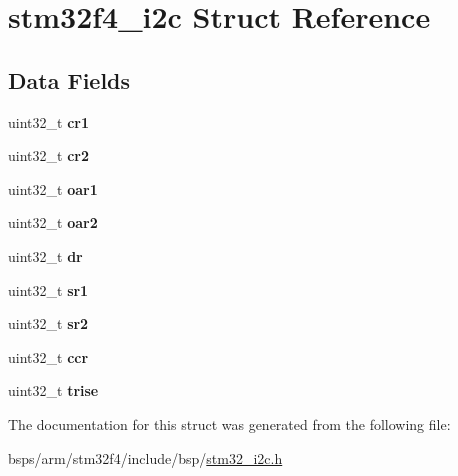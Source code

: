 \hypertarget{structstm32f4__i2c}{}\section{stm32f4\+\_\+i2c Struct Reference}
\label{structstm32f4__i2c}
\subsection*{Data Fields}
\begin{DoxyCompactItemize}
\item 
\mbox{\label{structstm32f4__i2c_a412766684f80de14fd12488ee9137410}} 
uint32\+\_\+t {\bfseries cr1}
\item 
\mbox{\label{structstm32f4__i2c_aaf477e758c1ce5fdbf9ca78893e851f2}} 
uint32\+\_\+t {\bfseries cr2}
\item 
\mbox{\label{structstm32f4__i2c_a9c78ba562e2374d9bb7b83eb67e51706}} 
uint32\+\_\+t {\bfseries oar1}
\item 
\mbox{\label{structstm32f4__i2c_a36e774cfa7054018cd6b41c36648a5fa}} 
uint32\+\_\+t {\bfseries oar2}
\item 
\mbox{\label{structstm32f4__i2c_a72ea4b4cc36022080838a24f8d6609ae}} 
uint32\+\_\+t {\bfseries dr}
\item 
\mbox{\label{structstm32f4__i2c_a55c69f2de28f5197d73a79c324a5a881}} 
uint32\+\_\+t {\bfseries sr1}
\item 
\mbox{\label{structstm32f4__i2c_aae7c3573e73a6c974a8c6e2d2b64f375}} 
uint32\+\_\+t {\bfseries sr2}
\item 
\mbox{\label{structstm32f4__i2c_a264381b139b6ab7dc4806325be68b7f4}} 
uint32\+\_\+t {\bfseries ccr}
\item 
\mbox{\label{structstm32f4__i2c_a7ab3340fd782ceee2f5b3d76d14365e8}} 
uint32\+\_\+t {\bfseries trise}
\end{DoxyCompactItemize}


The documentation for this struct was generated from the following file\+:\begin{DoxyCompactItemize}
\item 
bsps/arm/stm32f4/include/bsp/\mbox{\hyperlink{stm32__i2c_8h}{stm32\+\_\+i2c.\+h}}\end{DoxyCompactItemize}
